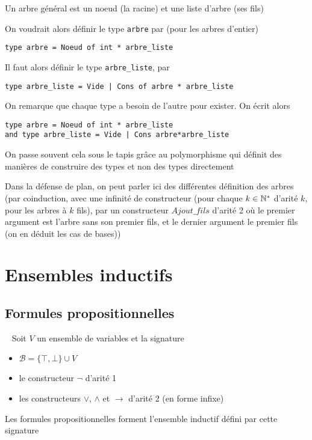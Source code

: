 \begin{definition}
	Un arbre général est un noeud (la racine) et une liste d'arbre (ses fils)
\end{definition}

On voudrait alors définir le type \texttt{arbre} par (pour les arbres d'entier)
\begin{lstlisting}
type arbre = Noeud of int * arbre_liste
\end{lstlisting}
Il faut alors définir le type \texttt{arbre\_liste}, par
\begin{lstlisting}
type arbre_liste = Vide | Cons of arbre * arbre_liste
\end{lstlisting}

On remarque que chaque type a besoin de l'autre pour exister. On écrit alors
\begin{lstlisting}
type arbre = Noeud of int * arbre_liste
and type arbre_liste = Vide | Cons arbre*arbre_liste
\end{lstlisting}

\begin{rem}
	On passe souvent cela sous le tapis grâce au polymorphisme qui définit des manières de construire des types et non des types directement
\end{rem}

\begin{com}
	Dans la défense de plan, on peut parler ici des différentes définition des arbres (par coinduction, avec une infinité de constructeur (pour chaque $k \in \mathbb{N}^*$ d'arité $k$, pour les arbres à $k$ fils), par un constructeur $Ajout\_fils$ d'arité 2 où le premier argument est l'arbre sans son premier fils, et le dernier argument le premier fils (on en déduit les cas de bases))
\end{com}

\section{Ensembles inductifs}

\subsection{Formules propositionnelles}

\begin{definition}~
	Soit $V$ un ensemble de variables et la signature \begin{itemize}
		\item $\mathcal B = \{ \top, \bot\} \cup V$
		\item le constructeur $\neg$ d'arité 1
		\item les constructeurs $\vee$, $\wedge$ et $\to$ d'arité 2 (en forme infixe)
	\end{itemize}
	Les formules propositionnelles forment l'ensemble inductif défini par cette signature
\end{definition}

